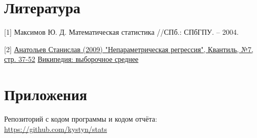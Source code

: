 \section{Литература}
[1] Максимов Ю. Д. Математическая статистика //СПб.: СПбГПУ. – 2004.

[2]
\href{http://quantile.ru/07/07-SA.pdf}{Анатольев Станислав (2009) "Непараметрическая регрессия", Квантиль, №7, стр. 37-52} \href{https://ru.wikipedia.org/wiki/%D0%92%D1%8B%D0%B1%D0%BE%D1%80%D0%BE%D1%87%D0%BD%D0%BE%D0%B5_%D1%81%D1%80%D0%B5%D0%B4%D0%BD%D0%B5%D0%B5}{Википедия: выборочное среднее}

\section{Приложения}

Репозиторий с кодом программы и кодом отчёта: \href{https://github.com/kystyn/stats}{https://github.com/kystyn/stats}



